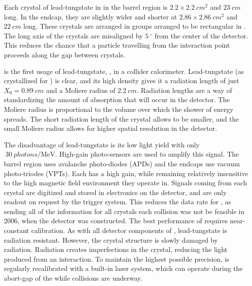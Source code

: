 Each crystal of lead-tungstate in \ECAL in the barrel region is \ensuremath{2.2\times \SI{2.2}{cm^2}} and \ensuremath{\SI{23}{cm}} long. In the endcap, they are slightly wider and shorter at \ensuremath{2.86\times \SI{2.86}{cm^2}} and \ensuremath{\SI{22}{cm}} long. These crystals are arranged in \fivebyfive groups arranged to be rectangular in \etaphi. The long axis of the crystals are misaligned by \ensuremath{\SI{5}{^\circ}} from the center of the detector. This reduces the chance that a particle travelling from the interaction point proceeds along the gap between crystals. 


\ECAL is the first usage of lead-tungstate, \leadtungstate, in a collider calorimeter. Lead-tungstate (as crystallized for \CMS) is clear, and its high density gives it a radiation length of just \ensuremath{X_0 = \SI{0.89}{cm}} and a Moliere radius of \ensuremath{\SI{2.2}{cm}}. Radiation lengths are a way of standardizing the amount of absorption that will occur in the detector. The Moliere radius is proportional to the volume over which the shower of energy spreads. The short radiation length of the crystal allows \ECAL to be smaller, and the small Moliere radius allows for higher spatial resolution in the detector.

The disadvantage of lead-tungstate is its low light yield with only \ensuremath{ ~\SI{30}{photons/\MeV}}. High-gain photo-sensors are used to amplify this signal.  The barrel region uses avalanche photo-diodes (APDs) and the endcaps use vacuum photo-triodes (VPTs).  Each has a high gain, while remaining relatively insensitive to the high magnetic field environment they operate in. Signals coming from each crystal are digitized and stored in electronics on the detector, and are only readout on request by the \CMS trigger system. This reduces the data rate for \ECAL, as sending all of the information for all crystals each collision was not be feasible in 2006, when the detector was constructed.
The best performance of \ECAL requires near-constant calibration. As with all detector components of \CMS, lead-tungstate is radiation resistant. However, the crystal structure is slowly damaged by radiation. Radiation creates imperfections in the crystal, reducing the light produced from an interaction. To maintain the highest possible precision, \ECAL is regularly recalibrated with a built-in laser system, which can operate during the abort-gap of the \LHC while collisions are underway.


